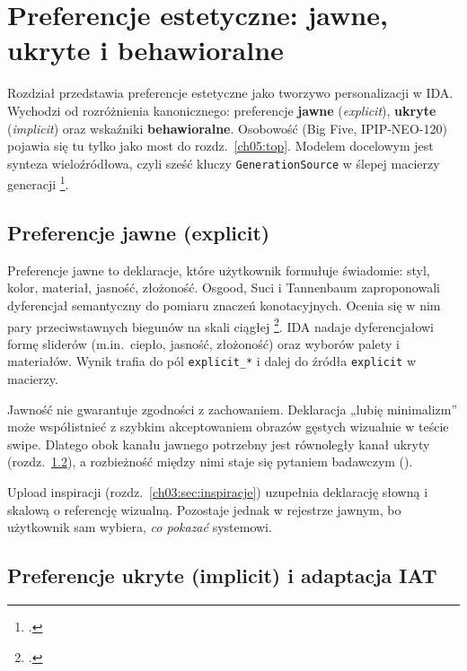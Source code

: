\chapter{Preferencje estetyczne: jawne, ukryte i behawioralne}
\label{ch03:top}

Rozdział przedstawia preferencje estetyczne jako tworzywo personalizacji w IDA.
Wychodzi od rozróżnienia kanonicznego: preferencje \textbf{jawne} (\emph{explicit}), \textbf{ukryte} (\emph{implicit}) oraz wskaźniki \textbf{behawioralne}. Osobowość (Big Five, IPIP-NEO-120) pojawia się tu tylko jako most do rozdz.~\ref{ch05:top}.
Modelem docelowym jest synteza wieloźródłowa, czyli sześć kluczy \texttt{GenerationSource} w ślepej macierzy generacji \footcite{idaPlatform2026}.

\section{Preferencje jawne (explicit)}
\label{ch03:sec:explicit}

Preferencje jawne to deklaracje, które użytkownik formułuje świadomie: styl, kolor, materiał, jasność, złożoność.
Osgood, Suci i Tannenbaum zaproponowali dyferencjał semantyczny do pomiaru znaczeń konotacyjnych. Ocenia się w nim pary przeciwstawnych biegunów na skali ciągłej \footcite{osgood1957measurement}.
IDA nadaje dyferencjałowi formę sliderów (m.in.\ ciepło, jasność, złożoność) oraz wyborów palety i materiałów. Wynik trafia do pól \texttt{explicit\_*} i dalej do źródła \texttt{explicit} w macierzy.

Jawność nie gwarantuje zgodności z zachowaniem.
Deklaracja „lubię minimalizm” może współistnieć z szybkim akceptowaniem obrazów gęstych wizualnie w teście swipe. Dlatego obok kanału jawnego potrzebny jest równoległy kanał ukryty (rozdz.~\ref{ch03:sec:implicit}), a rozbieżność między nimi staje się pytaniem badawczym ().

Upload inspiracji (rozdz.~\ref{ch03:sec:inspiracje}) uzupełnia deklarację słowną i skalową o referencję wizualną. Pozostaje jednak w rejestrze jawnym, bo użytkownik sam wybiera, \emph{co pokazać} systemowi.

\section{Preferencje ukryte (implicit) i adaptacja IAT}
\label{ch03:sec:implicit}

